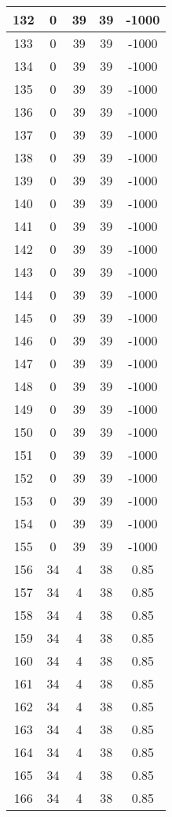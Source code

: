 \documentclass[letterpaper, 12pt]{article}
\begin{document}
\begin{longtable}{|c|c|c|c|c|}
\hline
132 & 0 & 39 & 39 & -1000 \\
\hline
133 & 0 & 39 & 39 & -1000 \\
\hline
134 & 0 & 39 & 39 & -1000 \\
\hline
135 & 0 & 39 & 39 & -1000 \\
\hline
136 & 0 & 39 & 39 & -1000 \\
\hline
137 & 0 & 39 & 39 & -1000 \\
\hline
138 & 0 & 39 & 39 & -1000 \\
\hline
139 & 0 & 39 & 39 & -1000 \\
\hline
140 & 0 & 39 & 39 & -1000 \\
\hline
141 & 0 & 39 & 39 & -1000 \\
\hline
142 & 0 & 39 & 39 & -1000 \\
\hline
143 & 0 & 39 & 39 & -1000 \\
\hline
144 & 0 & 39 & 39 & -1000 \\
\hline
145 & 0 & 39 & 39 & -1000 \\
\hline
146 & 0 & 39 & 39 & -1000 \\
\hline
147 & 0 & 39 & 39 & -1000 \\
\hline
148 & 0 & 39 & 39 & -1000 \\
\hline
149 & 0 & 39 & 39 & -1000 \\
\hline
150 & 0 & 39 & 39 & -1000 \\
\hline
151 & 0 & 39 & 39 & -1000 \\
\hline
152 & 0 & 39 & 39 & -1000 \\
\hline
153 & 0 & 39 & 39 & -1000 \\
\hline
154 & 0 & 39 & 39 & -1000 \\
\hline
155 & 0 & 39 & 39 & -1000 \\
\hline
156 & 34 & 4 & 38 & 0.85 \\
\hline
157 & 34 & 4 & 38 & 0.85 \\
\hline
158 & 34 & 4 & 38 & 0.85 \\
\hline
159 & 34 & 4 & 38 & 0.85 \\
\hline
160 & 34 & 4 & 38 & 0.85 \\
\hline
161 & 34 & 4 & 38 & 0.85 \\
\hline
162 & 34 & 4 & 38 & 0.85 \\
\hline
163 & 34 & 4 & 38 & 0.85 \\
\hline
164 & 34 & 4 & 38 & 0.85 \\
\hline
165 & 34 & 4 & 38 & 0.85 \\
\hline
166 & 34 & 4 & 38 & 0.85 \\

\end{longtable}
\end{document}
